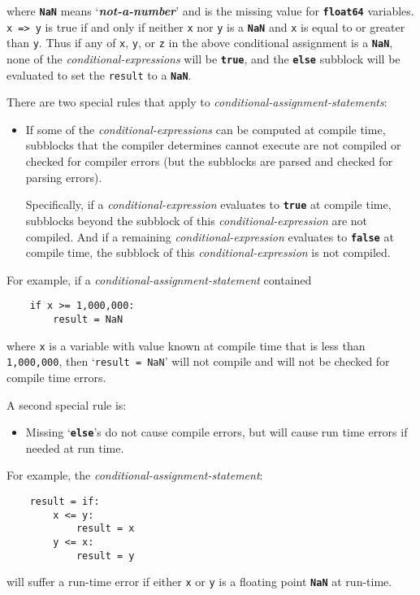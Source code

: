 \documentclass[12pt]{article}
\newcommand{\TT}[1]{{\tt \bfseries #1}}
\newcommand{\key}[1]{{\bf \em #1}\index{#1}}
\newenvironment{indpar}[1][0.3in]%
	{\begin{list}{}%
		     {\setlength{\itemsep}{0in}%
		      \setlength{\topsep}{0in}%
		      \setlength{\parsep}{1ex}%
		      \setlength{\labelwidth}{#1}%
		      \setlength{\leftmargin}{#1}%
		      \addtolength{\leftmargin}{\labelsep}}%
	 \item}%
	{\end{list}}
\begin{document}
where \TT{NaN} means `\key{not-a-number}' and is the missing
value for \TT{float64} variables.  {\tt x~=>~y} is true if
and only if neither {\tt x} nor {\tt y} is a \TT{NaN} and
{\tt x} is equal to or greater than {\tt y}.  Thus if any of
{\tt x}, {\tt y}, or {\tt z} in the above conditional assignment
is a \TT{NaN}, none of the {\em conditional-expressions}
will be \TT{true}, and the \TT{else} subblock will be evaluated to set
the {\tt result} to a \TT{NaN}.

There are two special rules that apply to
{\em conditional-assignment-statements}:\label{CONDITIONAL-SPECIAL-RULES}

\begin{itemize}
\item
If some of the {\em conditional-expressions} can be computed at compile
time, subblocks that the compiler determines cannot execute are not
compiled or checked for compiler errors (but the subblocks are parsed
and checked for parsing errors).

Specifically, if a {\em conditional-expression} evaluates to \TT{true}
at compile time, subblocks beyond the subblock
of this {\em conditional-expression}
are not compiled.  And if a remaining {\em conditional-expression}
evaluates to \TT{false} at compile time, the subblock of this
{\em conditional-expression} is not compiled.
\end{itemize}

For example, if a {\em conditional-assignment-statement}
contained
\begin{indpar}\begin{verbatim}
    if x >= 1,000,000:
        result = NaN
\end{verbatim}\end{indpar}
where {\tt x} is a variable with value known at compile time
that is less than {\tt 1,000,000}, then
`{\tt result = NaN}' will not compile
and will not be checked for compile time errors.


A second special rule is:

\begin{itemize}
\item\label{MISSING-ELSE-RULE}
Missing `\TT{else}'s do not cause compile errors,
but will cause run time errors if needed at run time.
\end{itemize}

For example, the {\em conditional-assignment-statement}:
\begin{indpar}\begin{verbatim}
    result = if:
        x <= y:
            result = x
        y <= x:
            result = y
\end{verbatim}\end{indpar}
will suffer a run-time error if either {\tt x} or {\tt y} is
a floating point \TT{NaN} at run-time.
\end{document}
